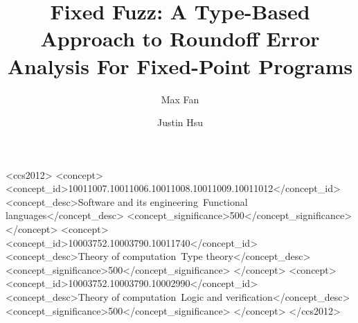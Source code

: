 \documentclass[acmsmall, review, anonymous]{acmart}
\begin{document}
\title[Fixed Fuzz]{Fixed Fuzz: A Type-Based Approach to Roundoff Error
Analysis For Fixed-Point Programs}

\author{Max Fan}

\author{Justin Hsu}

\renewcommand{\shortauthors}{Max Fan and Justin Hsu}

\begin{abstract}
\end{abstract}

\begin{CCSXML}
<ccs2012>
<concept>
<concept_id>10011007.10011006.10011008.10011009.10011012</concept_id>
<concept_desc>Software and its engineering~Functional languages</concept_desc>
<concept_significance>500</concept_significance>
</concept>
<concept>
<concept_id>10003752.10003790.10011740</concept_id>
<concept_desc>Theory of computation~Type theory</concept_desc>
<concept_significance>500</concept_significance>
</concept>
<concept>
<concept_id>10003752.10003790.10002990</concept_id>
<concept_desc>Theory of computation~Logic and verification</concept_desc>
<concept_significance>500</concept_significance>
</concept>
</ccs2012>
\end{CCSXML}

\end{document}
